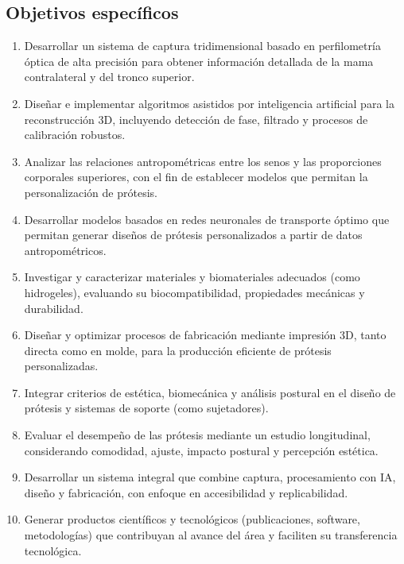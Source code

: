 \documentclass[12pt,a4paper]{article}
\begin{document}
\subsection{Objetivos específicos}
\begin{enumerate}
    \item Desarrollar un sistema de captura tridimensional basado en perfilometría óptica de alta precisión para obtener información detallada de la mama contralateral y del tronco superior.
    \item Diseñar e implementar algoritmos asistidos por inteligencia artificial para la reconstrucción 3D, incluyendo detección de fase, filtrado y procesos de calibración robustos.
    \item Analizar las relaciones antropométricas entre los senos y las proporciones corporales superiores, con el fin de establecer modelos que permitan la personalización de prótesis.
    \item Desarrollar modelos basados en redes neuronales de transporte óptimo que permitan generar diseños de prótesis personalizados a partir de datos antropométricos.
    \item Investigar y caracterizar materiales y biomateriales adecuados (como hidrogeles), evaluando su biocompatibilidad, propiedades mecánicas y durabilidad.
    \item Diseñar y optimizar procesos de fabricación mediante impresión 3D, tanto directa como en molde, para la producción eficiente de prótesis personalizadas.
    \item Integrar criterios de estética, biomecánica y análisis postural en el diseño de prótesis y sistemas de soporte (como sujetadores).
    \item Evaluar el desempeño de las prótesis mediante un estudio longitudinal, considerando comodidad, ajuste, impacto postural y percepción estética.
    \item Desarrollar un sistema integral que combine captura, procesamiento con IA, diseño y fabricación, con enfoque en accesibilidad y replicabilidad.
    \item Generar productos científicos y tecnológicos (publicaciones, software, metodologías) que contribuyan al avance del área y faciliten su transferencia tecnológica.
\end{enumerate}
\end{document}
